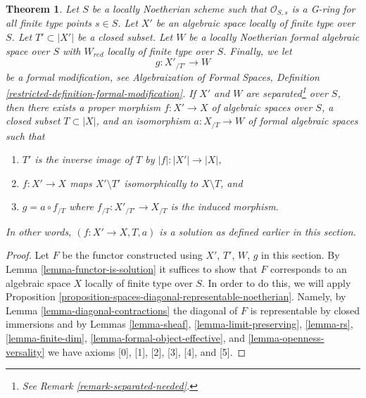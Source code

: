 \documentclass{stacks-project}
\newenvironment{reference}{\comment}{\endcomment}
\theoremstyle{plain}
\newtheorem{theorem}[subsection]{Theorem}
\theoremstyle{definition}
\theoremstyle{remark}
\numberwithin{equation}{subsection}
\begin{document}
\begin{theorem}
\label{theorem-contractions}
\begin{reference}
\cite[Theorem 3.1]{ArtinII}
\end{reference}
Let $S$ be a locally Noetherian scheme such that $\mathcal{O}_{S, s}$
is a G-ring for all finite type points $s \in S$. Let $X'$ be an algebraic
space locally of finite type over $S$. Let $T' \subset |X'|$ be a closed
subset. Let $W$ be a locally Noetherian formal algebraic space over $S$
with $W_{red}$ locally of finite type over $S$. Finally, we let
$$
g : X'_{/T'} \longrightarrow W
$$
be a formal modification, see Algebraization of Formal Spaces, Definition
\ref{restricted-definition-formal-modification}. If $X'$ and $W$ are
separated\footnote{See Remark \ref{remark-separated-needed}.} over $S$, then
there exists a proper morphism $f : X' \to X$ of algebraic spaces over $S$,
a closed subset $T \subset |X|$, and an isomorphism $a : X_{/T} \to W$
of formal algebraic spaces such that
\begin{enumerate}
\item $T'$ is the inverse image of $T$ by $|f| : |X'| \to |X|$,
\item $f : X' \to X$ maps $X' \setminus T'$ isomorphically to
$X \setminus T$, and
\item $g = a \circ f_{/T}$ where $f_{/T} : X'_{/T'} \to X_{/T}$
is the induced morphism.
\end{enumerate}
In other words, $(f : X' \to X, T, a)$ is a solution as defined earlier in
this section.
\end{theorem}

\begin{proof}
Let $F$ be the functor constructed using $X'$, $T'$, $W$, $g$ in this section.
By Lemma \ref{lemma-functor-is-solution} it suffices to show that
$F$ corresponds to an algebraic space $X$ locally of finite type over $S$.
In order to do this, we will apply
Proposition \ref{proposition-spaces-diagonal-representable-noetherian}.
Namely, by Lemma \ref{lemma-diagonal-contractions}
the diagonal of $F$ is representable by closed immersions
and by
Lemmas \ref{lemma-sheaf}, \ref{lemma-limit-preserving},
\ref{lemma-rs}, \ref{lemma-finite-dim},
\ref{lemma-formal-object-effective}, and \ref{lemma-openness-versality}
we have axioms [0], [1], [2], [3], [4], and [5].
\end{proof}
\end{document}
